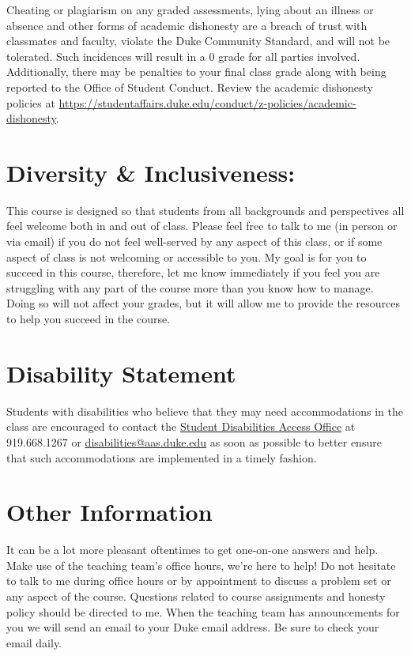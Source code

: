 \documentclass[11pt, a4paper]{article}
\begin{document}
Cheating or plagiarism on any graded assessments, lying about an illness or absence and other forms of academic dishonesty are a breach of trust with classmates and faculty, violate the Duke Community Standard, and will not be tolerated. Such incidences will result in a 0 grade for all parties involved. Additionally, there may be penalties to your final class grade along with being reported to the Office of Student Conduct. Review the academic dishonesty policies at \url{https://studentaffairs.duke.edu/conduct/z-policies/academic-dishonesty}.


\section{Diversity \& Inclusiveness:}
This course is designed so that students from all backgrounds and perspectives all feel welcome both in and out of class. Please feel free to talk to me (in person or via email) if you do not feel well-served by any aspect of this class, or if some aspect of class is not welcoming or accessible to you. My goal is for you to succeed in this course, therefore, let me know immediately if you feel you are struggling with any part of the course more than you know how to manage. Doing so will not affect your grades, but it will allow me to provide the resources to help you succeed in the course.


\section{Disability Statement} 
Students with disabilities who believe that they may need accommodations in the class are encouraged to contact the \href{https://access.duke.edu/students/staff.php}{Student Disabilities Access Office} at 919.668.1267 or \href{mailto:disabilities@aas.duke.edu}{disabilities@aas.duke.edu}  as soon as possible to better ensure that such accommodations are implemented in a timely fashion.


\section{Other Information} 
It can be a lot more pleasant oftentimes to get one-on-one answers and help. Make use of the teaching team's office hours, we're here to help! Do not hesitate to talk to me during office hours or by appointment to discuss a problem set or any aspect of the course.  Questions related to course assignments and honesty policy should be directed to me. When the teaching team has announcements for you we will send an email to your Duke email address. Be sure to check your email daily.
\end{document}
